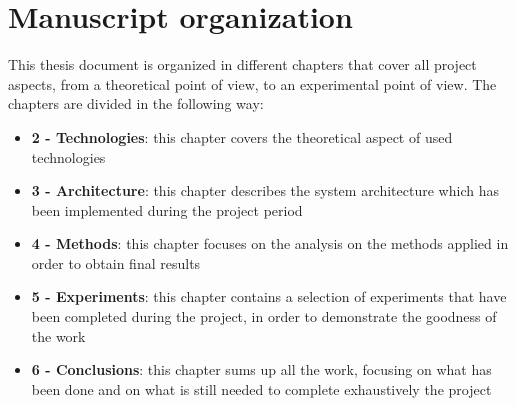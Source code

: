 \documentclass[\main/main.tex]{subfiles}
\begin{document}
\section{Manuscript organization}
This thesis document is organized in different chapters that cover all project aspects, from a theoretical point of view, to an experimental point of view.
The chapters are divided in the following way:
\begin{itemize}
    \item \textbf{2 - Technologies}: this chapter covers the theoretical aspect of used technologies
    \item \textbf{3 - Architecture}: this chapter describes the system architecture which has been implemented during the project period
    \item \textbf{4 - Methods}: this chapter focuses on the analysis on the methods applied in order to obtain final results
    \item \textbf{5 - Experiments}: this chapter contains a selection of experiments that have been completed during the project, in order to demonstrate the goodness of the work
    \item \textbf{6 - Conclusions}: this chapter sums up all the work, focusing on what has been done and on what is still needed to complete exhaustively the project
\end{itemize}
\end{document}
